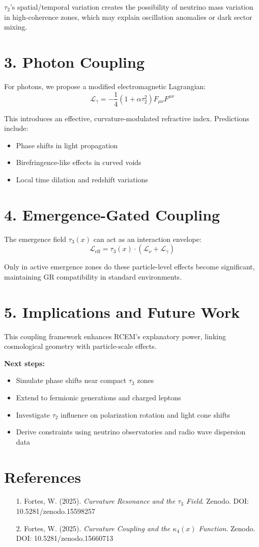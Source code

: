 \documentclass[12pt]{article}
\begin{document}
$\tau_2$'s spatial/temporal variation creates the possibility of neutrino mass variation in high-coherence zones, which may explain oscillation anomalies or dark sector mixing.

\section*{3. Photon Coupling}
For photons, we propose a modified electromagnetic Lagrangian:
\[
\mathcal{L}_\gamma = -\frac{1}{4} (1 + \alpha \tau_2^2) F_{\mu\nu} F^{\mu\nu}
\]

This introduces an effective, curvature-modulated refractive index. Predictions include:
\begin{itemize}
  \item Phase shifts in light propagation
  \item Birefringence-like effects in curved voids
  \item Local time dilation and redshift variations
\end{itemize}

\section*{4. Emergence-Gated Coupling}
The emergence field $\tau_3(x)$ can act as an interaction envelope:
\[
\mathcal{L}_{\text{eff}} = \tau_3(x) \cdot (\mathcal{L}_\nu + \mathcal{L}_\gamma)
\]

Only in active emergence zones do these particle-level effects become significant, maintaining GR compatibility in standard environments.

\section*{5. Implications and Future Work}
This coupling framework enhances RCEM's explanatory power, linking cosmological geometry with particle-scale effects.

\textbf{Next steps:}
\begin{itemize}
  \item Simulate phase shifts near compact $\tau_3$ zones
  \item Extend to fermionic generations and charged leptons
  \item Investigate $\tau_2$ influence on polarization rotation and light cone shifts
  \item Derive constraints using neutrino observatories and radio wave dispersion data
\end{itemize}

\section*{References}
\begin{itemize}
  \item[1.] Fortes, W. (2025). \textit{Curvature Resonance and the $\tau_3$ Field}. Zenodo. DOI: 10.5281/zenodo.15598257
  \item[2.] Fortes, W. (2025). \textit{Curvature Coupling and the $\kappa_4(x)$ Function}. Zenodo. DOI: 10.5281/zenodo.15660713
\end{itemize}
\end{document}
